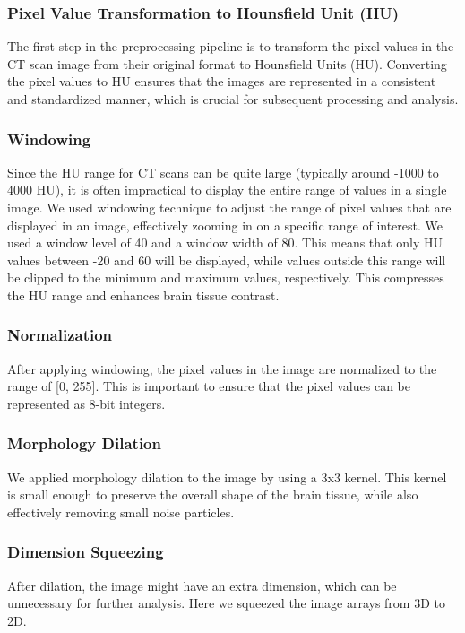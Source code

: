\documentclass[Print]{../Style/isecure-v24}
\begin{document}
\subsubsection{Pixel Value Transformation to Hounsfield Unit (HU)}
The first step in the preprocessing pipeline is to transform the pixel values in the CT scan image from their original format to Hounsfield Units (HU). Converting the pixel values to HU ensures that the images are represented in a consistent and standardized manner, which is crucial for subsequent processing and analysis.
\subsubsection{Windowing}
Since the HU range for CT scans can be quite large (typically around -1000 to 4000 HU), it is often impractical to display the entire range of values in a single image. We used windowing technique to adjust the range of pixel values that are displayed in an image, effectively zooming in on a specific range of interest.
We used a window level of 40 and a window width of 80. This means that only HU values between -20 and 60 will be displayed, while values outside this range will be clipped to the minimum and maximum values, respectively. This  compresses the HU range and enhances brain tissue contrast.
\subsubsection{Normalization}
After applying windowing, the pixel values in the image are normalized to the range of [0, 255]. This is important to ensure that the pixel values can be represented as 8-bit integers.
\subsubsection{Morphology Dilation}
We applied morphology dilation to the image by using a 3x3 kernel. This kernel is small enough to preserve the overall shape of the brain tissue, while also effectively removing small noise particles.
\subsubsection{Dimension Squeezing}
After dilation, the image might have an extra dimension, which can be unnecessary for further analysis. Here we squeezed the image arrays from 3D to 2D.\\
\end{document}
